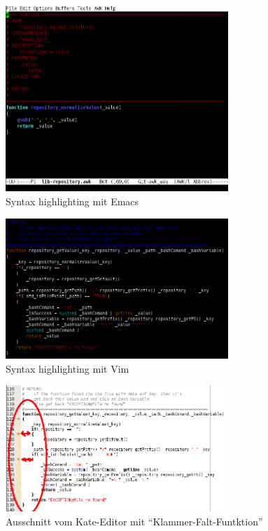 \documentclass[10pt,a4paper]{article}
\begin{document}
\begin{figure}[H]
 \centering
 \includegraphics[width=0.75\textwidth]{./awk-emacs.png}
 \caption[]{Syntax highlighting mit Emacs}
 \label{pic:emacs} 
\end{figure}


\begin{figure}[H]
 \centering
 \includegraphics[width=0.75\textwidth]{./awk-vim.png}
 \caption[]{Syntax highlighting mit Vim}
 \label{pic:vim} 
\end{figure}

\begin{figure}[H]
 \centering
 \includegraphics[width=0.75\textwidth]{./awk-kate.png}
 \caption[]{Ausschnitt vom Kate-Editor mit "`Klammer-Falt-Funtktion"'}
 \label{pic:kate}
\end{figure}
\end{document}
